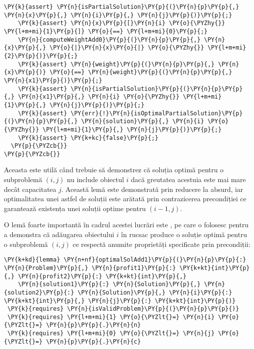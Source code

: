 \begin{sloppypar}
\begin{Verbatim}[commandchars=\\\{\}]
    \PY{k}{assert} \PY{n}{isPartialSolution}\PY{p}{(}\PY{n}{p}\PY{p}{,} \PY{n}{x}\PY{p}{,} \PY{n}{i}\PY{p}{,} \PY{n}{j}\PY{p}{)}\PY{p}{;}
    \PY{k}{assert} \PY{n}{x}\PY{p}{[}\PY{n}{i} \PY{o}{\PYZhy{}} \PY{l+m+mi}{1}\PY{p}{]} \PY{o}{==} \PY{l+m+mi}{0}\PY{p}{;}
    \PY{n}{computeWeightAdd0}\PY{p}{(}\PY{n}{p}\PY{p}{,} \PY{n}{x}\PY{p}{,} \PY{o}{|}\PY{n}{x}\PY{o}{|} \PY{o}{\PYZhy{}} \PY{l+m+mi}{2}\PY{p}{)}\PY{p}{;}
    \PY{k}{assert} \PY{n}{weight}\PY{p}{(}\PY{n}{p}\PY{p}{,} \PY{n}{x}\PY{p}{)} \PY{o}{==} \PY{n}{weight}\PY{p}{(}\PY{n}{p}\PY{p}{,} \PY{n}{x1}\PY{p}{)}\PY{p}{;}
    \PY{k}{assert} \PY{n}{isPartialSolution}\PY{p}{(}\PY{n}{p}\PY{p}{,} \PY{n}{x1}\PY{p}{,} \PY{n}{i} \PY{o}{\PYZhy{}} \PY{l+m+mi}{1}\PY{p}{,} \PY{n}{j}\PY{p}{)}\PY{p}{;}
    \PY{k}{assert} \PY{err}{!}\PY{n}{isOptimalPartialSolution}\PY{p}{(}\PY{n}{p}\PY{p}{,} \PY{n}{solution}\PY{p}{,} \PY{n}{i} \PY{o}{\PYZhy{}} \PY{l+m+mi}{1}\PY{p}{,} \PY{n}{j}\PY{p}{)}\PY{p}{;}
    \PY{k}{assert} \PY{k+kc}{false}\PY{p}{;}
  \PY{p}{\PYZcb{}}
\PY{p}{\PYZcb{}}
\end{Verbatim}
\hspace{4mm} Aceasta este utilă când trebuie să demonstrez că soluția optimă pentru o subproblemă $(i, j)$ nu include obiectul $i$ dacă greutatea acestuia este mai mare decât capacitatea $j$. Această lemă este demonstrată prin reducere la absurd, iar optimalitatea unei astfel de soluții este arătată prin contrazicerea precondiției ce garantează existența unei soluții optime pentru $(i - 1, j)$. \par
O lemă foarte importantă în cadrul acestei lucrări este , pe care o folosesc pentru a demonstra că adăugarea obiectului $i$ în rucsac produce o soluție optimă pentru o subproblemă $(i, j)$ ce respectă anumite proprietăți specificate prin precondiții:
\begin{Verbatim}[commandchars=\\\{\}]
\PY{k+kd}{lemma} \PY{n+nf}{optimalSolAdd1}\PY{p}{(}\PY{n}{p}\PY{p}{:} \PY{n}{Problem}\PY{p}{,} \PY{n}{profit1}\PY{p}{:} \PY{k+kt}{int}\PY{p}{,} \PY{n}{profit2}\PY{p}{:} \PY{k+kt}{int}\PY{p}{,} 
    \PY{n}{solution1}\PY{p}{:} \PY{n}{Solution}\PY{p}{,} \PY{n}{solution2}\PY{p}{:} \PY{n}{Solution}\PY{p}{,} \PY{n}{i}\PY{p}{:} \PY{k+kt}{int}\PY{p}{,} \PY{n}{j}\PY{p}{:} \PY{k+kt}{int}\PY{p}{)}
 \PY{k}{requires} \PY{n}{isValidProblem}\PY{p}{(}\PY{n}{p}\PY{p}{)}
 \PY{k}{requires} \PY{l+m+mi}{1} \PY{o}{\PYZlt{}=} \PY{n}{i} \PY{o}{\PYZlt{}=} \PY{n}{p}\PY{p}{.}\PY{n}{n}
 \PY{k}{requires} \PY{l+m+mi}{0} \PY{o}{\PYZlt{}=} \PY{n}{j} \PY{o}{\PYZlt{}=} \PY{n}{p}\PY{p}{.}\PY{n}{c}

\end{Verbatim}
\end{sloppypar}
